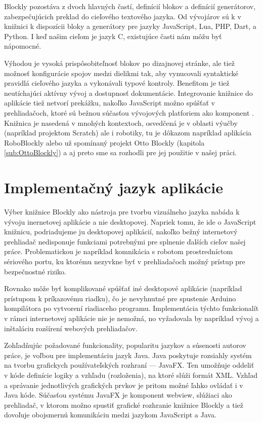 Blockly pozostáva z dvoch hlavných častí, definícií blokov a definícií generátorov, zabezpečujúcich preklad do cieľového textového jazyka. Od vývojárov sú k v knižnici k dispozícii  bloky a generátory pre jazyky JavaScript, Lua, PHP, Dart, a Python. I keď našim cieľom je jazyk C, existujúce časti nám môžu byť nápomocné.

Výhodou je vysoká prispôsobiteľnosť blokov po dizajnovej stránke, ale tiež možnosť konfigurácie spojov medzi dielikmi tak, aby vynucovali syntaktické pravidlá cieľového jazyka a vykonávali typové kontroly. Benefitom je tiež neutíchajúci aktívny vývoj a dostupnosť dokumentácie. Integrovanie knižnice do aplikácie tiež netvorí prekážku, nakoľko JavaScript možno spúšťať v prehliadačoch, ktoré sú bežnou súčasťou vývojových platforiem ako komponent . Knižnica je nasedená v mnohých kontextoch, osvedčená je v oblasti výučby (napríklad projektom Scratch) ale i robotiky, tu je dôkazom napríklad aplikácia RoboBlockly alebo už spomínaný projekt Otto Blockly (kapitola \ref{sub:OttoBlockly}) a aj preto sme sa rozhodli pre jej použitie v našej práci.


\section{Implementačný jazyk aplikácie}
Výber knižnice Blockly ako nástroja pre tvorbu vizuálneho jazyka nabáda k vývoju inernetovej aplikácie a nie desktopovej. Napriek tomu, že ide o JavaScript knižnicu, podriadujeme ju desktopovej aplikácií, nakoľko bežný internetový prehliadač nedisponuje funkciami potrebnými pre splnenie ďalších cieľov našej práce. Problematickou je napríklad komnikácia s robotom prostredníctom sériového portu, ku ktorému nezyvkne byť v prehliadačoch možný prístup pre bezpečnostné riziko. 

Rovnako môže byť komplikované spúšťať iné desktopové aplikácie (napríklad prístupom k príkazovému riadku), čo je nevyhnutné pre spustenie Arduino kompilátora po vytvorení riadiaceho programu. Implementácia týchto funkcionalít v rámci internetovej aplikácie nie je nemožná, no vyžadovala by napríklad vývoj a inštaláciu rozšírení webových prehliadačov.

Zohľadňujúc požadované funkcionality, popularitu jazykov a súsenosti autorov práce, je voľbou pre implementáciu jazyk Java. Java poskytuje rozsiahly systém na tvorbu grafickych používateľských rozhraní --- JavaFX. Ten umožňuje oddeliť v kóde definície logiky a vzhľadu (rozloženia), na ktoré slúži formát XML. Vzhľad a správanie jednotlivých grafických prvkov je pritom možné ľahko ovládať i v Java kóde. Súčasťou systému JavaFX je komponent webview, slúžiaci ako prehliadač, v ktorom možno spustiť grafické rozhranie knižnice Blockly a tiež dovoľuje obojsmernú komunikáciu medzi jazykom JavaScript a Java.

